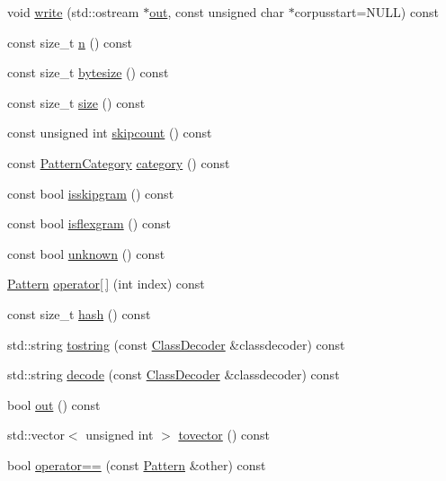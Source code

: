 \begin{DoxyCompactItemize}
\item 
void \hyperlink{classPattern_ade7dc8f61e70e18004585cd9e50a154c}{write} (std\+::ostream $\ast$\hyperlink{classPattern_ac608089f2fee04e0e8ff6249f14517e4}{out}, const unsigned char $\ast$corpusstart=N\+U\+L\+L) const 
\item 
const size\+\_\+t \hyperlink{classPattern_a13e66bbb8dd77219255ade5aa5f72c7c}{n} () const 
\item 
const size\+\_\+t \hyperlink{classPattern_a57440647189b9e07bdf6ddbcfb0b3f7f}{bytesize} () const 
\item 
const size\+\_\+t \hyperlink{classPattern_a400a18c6a1b6de3eb574b6a0f12c9ca2}{size} () const 
\item 
const unsigned int \hyperlink{classPattern_a0ed5bb99641eb8fd96be7890f2ea5c89}{skipcount} () const 
\item 
const \hyperlink{pattern_8h_a17879f85ec892834fb691c61e71dfe54}{Pattern\+Category} \hyperlink{classPattern_af01c6684c8cec38d3ad57d4303dac5fb}{category} () const 
\item 
const bool \hyperlink{classPattern_a609a2ba1f832678fb69baa201f50b163}{isskipgram} () const 
\item 
const bool \hyperlink{classPattern_a8bef14a88603946827aa1342b47ec001}{isflexgram} () const 
\item 
const bool \hyperlink{classPattern_ad2325ce11035ced772f72dbfd4b57c01}{unknown} () const 
\item 
\hyperlink{classPattern}{Pattern} \hyperlink{classPattern_a96b22b7fdcfde6313ee6c6452c70edbe}{operator\mbox{[}$\,$\mbox{]}} (int index) const 
\item 
const size\+\_\+t \hyperlink{classPattern_a54b434666a79e1567a448eea096dcbb9}{hash} () const 
\item 
std\+::string \hyperlink{classPattern_a810d538d873a823d0b6dbe04d2faf334}{tostring} (const \hyperlink{classClassDecoder}{Class\+Decoder} \&classdecoder) const 
\item 
std\+::string \hyperlink{classPattern_abb031f769621b5a2d5652a29a85b86a2}{decode} (const \hyperlink{classClassDecoder}{Class\+Decoder} \&classdecoder) const 
\item 
bool \hyperlink{classPattern_ac608089f2fee04e0e8ff6249f14517e4}{out} () const 
\item 
std\+::vector$<$ unsigned int $>$ \hyperlink{classPattern_a252702c8acfe5ef9b2aa9783bf4f78ed}{tovector} () const 
\item 
bool \hyperlink{classPattern_a2b5a2c979473b3a62b17128f4c628be2}{operator==} (const \hyperlink{classPattern}{Pattern} \&other) const 

\end{DoxyCompactItemize}
